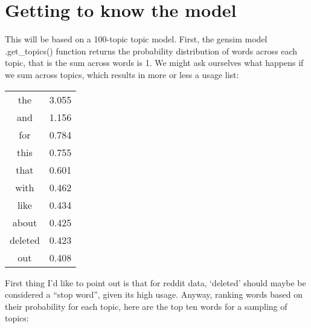 \documentclass[11pt]{article} %
\begin{document}
\section{Getting to know the model}

This will be based on a 100-topic topic model. First, the gensim model .get\_topics() function returns the probability distribution of words across each topic, that is the sum across words is 1. We might ask ourselves what happens if we sum across topics, which results in more or less a usage list:

\begin{tabular}{|c|c|}
the & 3.055\\
and & 1.156\\
for & 0.784\\
this & 0.755\\
that & 0.601\\
with & 0.462\\
like & 0.434\\
about & 0.425\\
deleted & 0.423\\
out & 0.408\\
\end{tabular}

First thing I'd like to point out is that for reddit data, `deleted' should maybe be considered a ``stop word'', given its high usage. Anyway, ranking words based on their probability for each topic, here are the top ten words for a sampling of topics:
\end{document}
